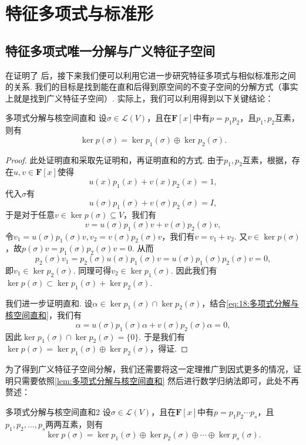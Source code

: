 \section{特征多项式与标准形}
\subsection{特征多项式唯一分解与广义特征子空间}

在证明了 后，接下来我们便可以利用它进一步研究特征多项式与相似标准形之间的关系. 我们的目标是找到能在直和后得到原空间的不变子空间的分解方式（事实上就是找到广义特征子空间）. 实际上，我们可以利用得到以下关键结论：
\begin{lemma}{}{多项式分解与核空间直和}
    设$\sigma\in \mathcal{L}(V)$，且在$\mathbf{F}[x]$中有$p=p_1p_2$，且$p_1,p_2$互素，则有
    \[\ker p(\sigma)=\ker p_1(\sigma)\oplus\ker p_2(\sigma).\]
\end{lemma}

\begin{proof}
    此处证明直和采取先证明和，再证明直和的方式. 由于$p_1,p_2$互素，根据，存在$u,v\in\mathbf{F}[x]$使得
    \[u(x)p_1(x)+v(x)p_2(x)=1,\]
    代入$\sigma$有
    \[u(\sigma)p_1(\sigma)+v(\sigma)p_2(\sigma)=I,\]
    于是对于任意$v\in \ker p(\sigma) \subseteq V$，我们有
    \begin{equation} \label{eq:18:多项式分解与核空间直和}
        v=u(\sigma)p_1(\sigma)v+v(\sigma)p_2(\sigma)v,
    \end{equation}
    令$v_1=u(\sigma)p_1(\sigma)v,v_2=v(\sigma)p_2(\sigma)v$，我们有$v=v_1+v_2$. 又$v\in \ker p(\sigma)$，故$p(\sigma)v=p_1(\sigma)p_2(\sigma)v=0$. 从而
    \[p_2(\sigma)v_1=p_2(\sigma)u(\sigma)p_1(\sigma)v=u(\sigma)p_1(\sigma)p_2(\sigma)v=0,\]
    即$v_1\in \ker p_2(\sigma)$. 同理可得$v_2\in \ker p_1(\sigma)$. 因此我们有$\ker p(\sigma)\subset \ker p_1(\sigma)+\ker p_2(\sigma)$.

    我们进一步证明直和. 设$\alpha\in \ker p_1(\sigma)\cap \ker p_2(\sigma)$，结合\autoref{eq:18:多项式分解与核空间直和}，我们有
    \[\alpha=u(\sigma)p_1(\sigma)\alpha+v(\sigma)p_2(\sigma)\alpha=0,\]
    因此$\ker p_1(\sigma)\cap \ker p_2(\sigma)=\{0\}$. 于是我们有$\ker p(\sigma)=\ker p_1(\sigma)\oplus\ker p_2(\sigma)$，得证.
\end{proof}

为了得到广义特征子空间分解，我们还需要将这一定理推广到因式更多的情况，证明只需要依照\autoref{lem:多项式分解与核空间直和} 然后进行数学归纳法即可，此处不再赘述：
\begin{corollary}{}{多项式分解与核空间直和2}
    设$\sigma\in \mathcal{L}(V)$，且在$\mathbf{F}[x]$中有$p=p_1p_2\cdots p_s$，且$p_1,p_2,\ldots,p_s$两两互素，则有\[\ker p(\sigma)=\ker p_1(\sigma)\oplus\ker p_2(\sigma)\oplus\cdots\oplus\ker p_s(\sigma).\]
\end{corollary}

